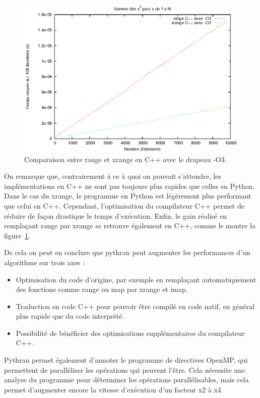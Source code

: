 \documentclass[a4paper]{article}
\begin{document}
\begin{figure}[h]
  \includegraphics[scale=1]{./Pictures/RangeXrangeCppO3}
  \caption{Comparaison entre range et xrange en C++ avec le drapeau -O3.}
  \label{RangeXrangeCppO3}
\end{figure}

On remarque que, contrairement à ce à quoi on pouvait s'attendre, les
implémentations en C++ ne sont pas toujours plus rapides que celles en
Python. Dans le cas du xrange, le programme en Python est légèrement
plus performant que celui en C++. Cependant, l'optimisation du
compilateur C++ permet de réduire de façon drastique le temps
d'exécution. Enfin, le gain réalisé en remplaçant range par xrange se
retrouve également en C++, comme le montre la
figure~\ref{RangeXrangeCppO3}.

De cela on peut en conclure que pythran peut augmenter les
performances d'un algorithme sur trois axes :

\begin{itemize}
\item Optimisation du code d'origine, par exemple en remplaçant
  automatiquement des fonctions comme range ou map par xrange et imap.
\item Traduction en code C++ pour pouvoir être compilé en code natif,
  en général plus rapide que du code interprété.
\item Possibilité de bénéficier des optimisations supplémentaires du
  compilateur C++.
\end{itemize}


Pythran permet également d'annoter le programme de directives OpenMP,
qui permettent de paralléliser les opérations qui peuvent l'être. Cela
nécessite une analyse du programme pour déterminer les opérations
parallélisables, mais cela permet d'augmenter encore la vitesse
d'exécution d'un facteur x2 à x4\cite{PythranRenpar}.
\end{document}
